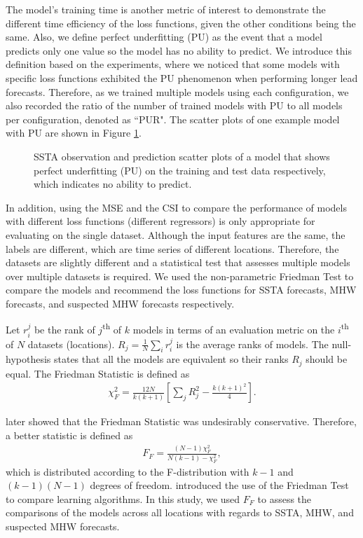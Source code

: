 \documentclass[11pt, a4paper]{article}
\begin{document}
The model's training time is another metric of interest to demonstrate the different time efficiency of the loss functions, given the other conditions being the same. Also, we define perfect underfitting (PU) as the event that a model predicts only one value so the model has no ability to predict. We introduce this definition based on the experiments, where we noticed that some models with specific loss functions exhibited the PU phenomenon when performing longer lead forecasts. Therefore, as we trained multiple models using each configuration, we also recorded the ratio of the number of trained models with PU to all models per configuration, denoted as ``PUR". The scatter plots of one example model with PU are shown in Figure \ref{fg:pu}.

\begin{figure}[H]
\centering
{}
\caption{SSTA observation and prediction scatter plots of a model that shows perfect underfitting (PU) on the training and test data respectively, which indicates no ability to predict.}\label{fg:pu}
\end{figure}

In addition, using the MSE and the CSI to compare the performance of models with different loss functions (different regressors) is only appropriate for evaluating on the single dataset. Although the input features are the same, the labels are different, which are time series of different locations. Therefore, the datasets are slightly different and a statistical test that assesses multiple models over multiple datasets is required. We used the non-parametric Friedman Test \citep{friedman1937use,friedman1940comparison} to compare the models and recommend the loss functions for SSTA forecasts, MHW forecasts, and suspected MHW forecasts respectively.

Let $r_i^j$ be the rank of $j$\textsuperscript{th} of $k$ models in terms of an evaluation metric on the $i$\textsuperscript{th} of $N$ datasets (locations). $R_j=\frac{1}{N}\sum_i r_i^j$ is the average ranks of models. The null-hypothesis states that all the models are equivalent so their ranks $R_j$ should be equal. The Friedman Statistic is defined as
\begin{align}
\chi_F^2=\frac{12N}{k(k+1)}[\sum_j R_j^2-\frac{k(k+1)^2}{4}].
\end{align}

\citet{iman1980approximations} later showed that the Friedman Statistic was undesirably conservative. Therefore, a better statistic is defined as
\begin{align}
F_F=\frac{(N-1)\chi_F^2}{N(k-1)-\chi_F^2},
\end{align}
which is distributed according to the F-distribution with $k-1$ and $(k-1)(N-1)$ degrees of freedom. \citet{demvsar2006statistical} introduced the use of the Friedman Test to compare learning algorithms. In this study, we used $F_F$ to assess the comparisons of the models across all locations with regards to SSTA, MHW, and suspected MHW forecasts.
\end{document}
